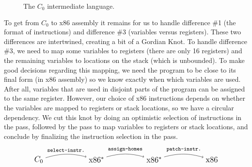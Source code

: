 \documentclass[11pt]{book}
\begin{document}
\begin{figure}[tbp]
\caption{The $C_0$ intermediate language.}
\label{fig:c0-syntax}
\end{figure}

To get from $C_0$ to x86 assembly it remains for us to handle
difference \#1 (the format of instructions) and difference \#3
(variables versus registers). These two differences are intertwined,
creating a bit of a Gordian Knot. To handle difference \#3, we need to
map some variables to registers (there are only 16 registers) and the
remaining variables to locations on the stack (which is unbounded). To
make good decisions regarding this mapping, we need the program to be
close to its final form (in x86 assembly) so we know exactly when
which variables are used. After all, variables that are used in
disjoint parts of the program can be assigned to the same register.
However, our choice of x86 instructions depends on whether the
variables are mapped to registers or stack locations, so we have a
circular dependency. We cut this knot by doing an optimistic selection
of instructions in the  pass, followed by the
 pass to map variables to registers or stack
locations, and conclude by finalizing the instruction selection in the
 pass.
\[
\begin{tikzpicture}[baseline=(current  bounding  box.center)]
\node (1) at (0,0)  {\large $C_0$};
\node (2) at (3,0)  {\large $\text{x86}^{*}$};
\node (3) at (6,0)  {\large $\text{x86}^{*}$};
\node (4) at (9,0) {\large $\text{x86}$};

\path[->,bend left=15] (1) edge [above] node {\ttfamily\footnotesize select-instr.} (2);
\path[->,bend left=15] (2) edge [above] node {\ttfamily\footnotesize assign-homes} (3);
\path[->,bend left=15] (3) edge [above] node {\ttfamily\footnotesize patch-instr.} (4);
\end{tikzpicture}
\]
\end{document}
